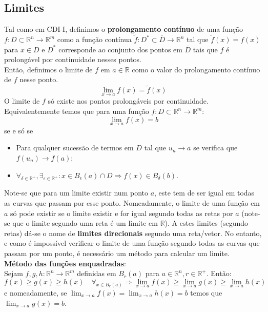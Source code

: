 \documentclass{article}
\begin{document}
\subsection{Limites}
Tal como em CDI-I, definimos o \textbf{prolongamento contínuo} de uma função $f: D \subset \mathbb{R}^n \to \mathbb{R}^m$ como a função contínua $\tilde{f}: D^* \subset \overline{D} \to \mathbb{R}^n$ tal que $\tilde{f}(x) = f(x)$ para $x \in D$ e $D^*$ corresponde ao conjunto dos pontos em $\overline{D}$ tais que $f$ é prolongável por continuidade nesses pontos.\\
Então, definimos o limite de $f$ em $a \in \mathbb{R}$ como o valor do prolongamento contínuo de $f$ nesse ponto.
$$
\lim_{x \to a} f(x) = \tilde{f}(x)
$$
O limite de $f$ só existe nos pontos prolongáveis por continuidade.\\
Equivalentemente temos que para uma função $f: D \subset \mathbb{R}^n \to \mathbb{R}^m$:
$$
\lim_{x \to a} f(x) = b
$$
se e só se
\begin{itemize}
	\item Para qualquer sucessão de termos em $D$ tal que $u_n \to a$ se verifica que $f(u_n) \to f(a)$;
	\item $\forall_{\delta \in \mathbb{R}^+}, \exists_{\epsilon \in \mathbb{R}^+}: x \in B_\epsilon(a) \cap D \Rightarrow f(x) \in B_\delta(b)$.
\end{itemize}
Note-se que para um limite existir num ponto $a$, este tem de ser igual em todas as curvas que passam por esse ponto. Nomeadamente, o limite de uma função em $a$ só pode existir se o limite existir e for igual segundo todas as retas por $a$ (note-se que o limite segundo uma reta é um limite em $\mathbb{R}$). A estes limites (segundo retas) dá-se o nome de \textbf{limites direcionais} segundo uma reta/vetor.
No entanto, e como é impossível verificar o limite de uma função segundo todas as curvas que passam por um ponto, é necessário um método para calcular um limite.\\
\textbf{Método das funções enquadradas}:\\
Sejam $f,g,h: \mathbb{R}^n \to \mathbb{R}^m$ definidas em $B_r(a)$ para $a \in \mathbb{R}^n, r \in \mathbb{R}^+$. Então:
$$
f(x) \geq g(x) \geq h(x) \quad \forall_{x \in B_r(a)} \Rightarrow \lim_{x \to a} f(x) \geq \lim_{x \to a} g(x) \geq \lim_{x \to a} h(x) 
$$
e nomeadamente, se $\lim_{x \to a} f(x) = \lim_{x \to a} h(x) = b$ temos que $\lim_{x \to a} g(x) = b$.
\end{document}
